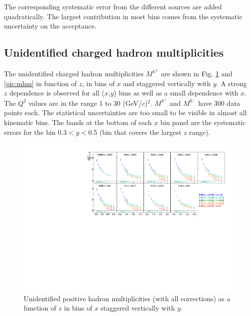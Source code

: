 The corresponding systematic error from the different sources are added quadratically. The largest contribution in most bins comes from the systematic uncertainty on the acceptance.

\subsection{Unidentified charged hadron multiplicities}

The unidentified charged hadron multiplicities $M^{h^{\pm}}$ are shown in Fig. \ref{pic:mhp} and \ref{pic:mhm} in function of $z$, in bins of $x$ and staggered vertically with $y$. A strong $z$ dependence is observed for all ($x$,$y$) bins as well as a small dependence with $x$. The $Q^2$ values are in the range 1 to 30 (GeV/$c$)$^2$. $M^{h^+}$ and $M^{h^-}$ have 300 data points each. The statistical uncertainties are too small to be visible in almost all kinematic bins. The bands at the bottom of each $x$ bin panel are the systematic errors for the bin 0.3$< y <$0.5 (bin that covers the largest $z$ range).

\begin{figure}[!h]
  \centering
	\includegraphics[scale=0.85]{./gfx/hp.pdf}
	\caption{Unidentified positive hadron multiplicities (with all corrections) as a function of $z$ in bins of $x$ staggered vertically with $y$.}
	\label{pic:mhp}
\end{figure}

